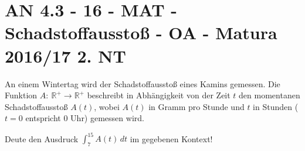 \section{AN 4.3 - 16 - MAT - Schadstoffausstoß - OA - Matura 2016/17 2. NT}

\begin{beispiel}{1} %
An einem Wintertag wird der Schadstoffausstoß eines Kamins gemessen. Die Funktion $A:~\mathbb R^+ \to \mathbb R^+$ beschreibt in Abhängigkeit von der Zeit $t$ den momentanen Schadstoffausstoß $A(t)$, wobei $A(t)$ in Gramm pro Stunde und $t$ in Stunden ($t=0$ entspricht 0 Uhr) gemessen wird. \leer

Deute den Ausdruck $\displaystyle\int^{15}_7\! A(t)\,dt$ im gegebenen Kontext!

\end{beispiel}